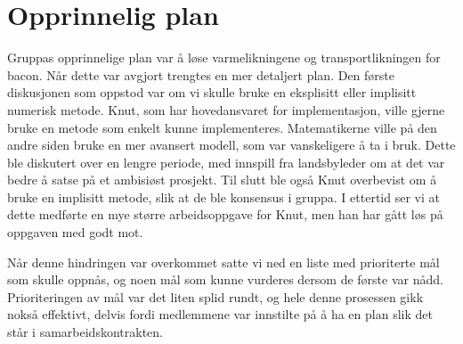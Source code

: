 

\section{Opprinnelig plan}
Gruppas opprinnelige plan var å løse varmelikningene og transportlikningen for
bacon. Når dette var avgjort trengtes en mer detaljert plan. Den første
diskusjonen som oppstod var om vi skulle bruke en eksplisitt eller implisitt
numerisk metode. Knut, som har hovedansvaret for implementasjon, ville gjerne
bruke en metode som enkelt kunne implementeres. Matematikerne ville
på den andre siden bruke en mer avansert modell, som var vanskeligere å ta i
bruk. Dette ble diskutert over en lengre periode, med innspill fra landsbyleder
om at det var bedre å satse på et ambisiøst prosjekt. Til slutt ble også Knut
overbevist om å bruke en implisitt metode, slik at de ble konsensus i gruppa. I
ettertid ser vi at dette medførte en mye større arbeidsoppgave for Knut, men han
har gått løs på oppgaven med godt mot. 

Når denne hindringen var overkommet satte vi ned en liste med prioriterte mål
som skulle oppnås, og noen mål som kunne vurderes dersom de første var
nådd. Prioriteringen av mål var det liten splid rundt, og hele denne prosessen
gikk nokså effektivt, delvis fordi medlemmene var innstilte på å ha en plan slik
det står i samarbeidskontrakten. 

